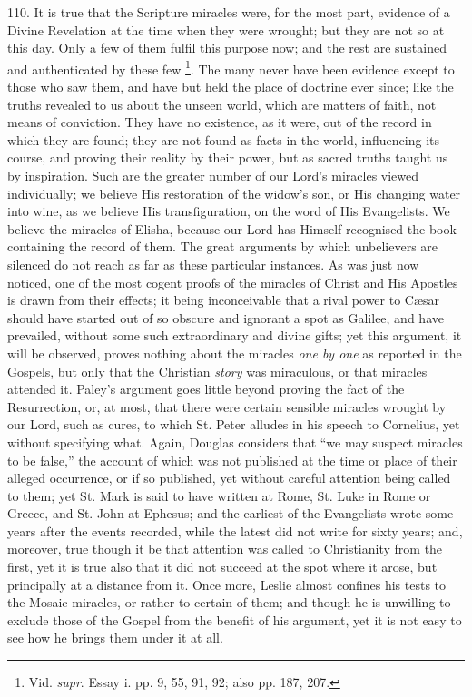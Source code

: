 110.
It is true that the Scripture miracles were, for the most part,
evidence of a Divine Revelation at the time when they were
wrought; but they are not so at this day. Only a few of them fulfil
this purpose now; and the rest are sustained and authenticated by
these few \footnote{Vid. \emph{supr}. Essay i. pp. 9, 55, 91, 92;
also pp. 187, 207.}. The many never
have been evidence except to those who saw them, and have but held the
place of doctrine ever since; like the truths revealed to us about the
unseen world, which are matters of faith, not means of conviction.
They have no existence, as it were, out of the record in which they
are found; they are not found as facts in the world, influencing its
course, and proving their reality by their power, but as sacred truths
taught us by inspiration. Such are the greater number of our Lord's
miracles viewed individually; we believe His restoration of the widow's
son, or His changing water into wine, as we believe His
transfiguration, on the word of His Evangelists. We believe the
miracles of Elisha, because our Lord has Himself recognised the book
containing the record of them. The great arguments by which
unbelievers are silenced do not reach as far as these particular
instances. As was just now noticed, one of the most cogent proofs of
the miracles of Christ and His Apostles is drawn from their effects;
it being inconceivable that a rival power to Cæsar should have
started out of so obscure and ignorant a spot as Galilee, and have
prevailed, without some such extraordinary and divine gifts; yet this
argument, it will be observed, proves nothing about the miracles
\emph{one by one} as reported in the Gospels, but only that the
Christian \emph{story} was miraculous, or that miracles attended it.
Paley's argument goes little beyond proving the fact of the
Resurrection, or, at most, that there were certain sensible miracles
wrought by our Lord, such as cures, to which St. Peter alludes in his
speech to Cornelius, yet without specifying what. Again, Douglas
considers that ``we may suspect miracles to be false,'' the account of
which was not published at the time or place of their alleged
occurrence, or if so published, yet without careful attention being
called to them; yet St. Mark is said to have written at Rome, St. Luke
in Rome or Greece, and St. John at Ephesus; and the earliest of the
Evangelists wrote some years after the events recorded, while the
latest did not write for sixty years; and, moreover, true though it be
that attention was called to Christianity from the first, yet it is
true also that it did not succeed at the spot where it arose, but
principally at a distance from it. Once more, Leslie almost confines
his tests to the Mosaic miracles, or rather to certain of them; and
though he is unwilling to exclude those of the Gospel from the benefit
of his argument, yet it is not easy to see how he brings them under it
at all.

